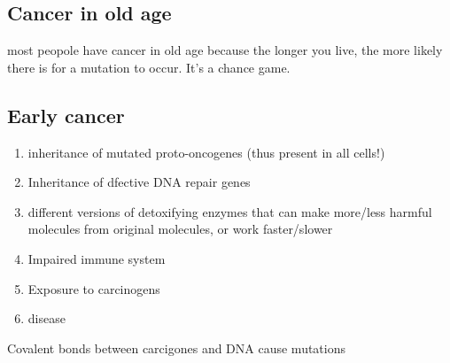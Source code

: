 \documentclass[12pt]{article}
\begin{document}
\subsection{Cancer in old age}
most peopole have cancer in old age because the longer you live,
the more likely there is for a mutation to occur. It's a chance game.

\subsection{Early cancer}
\begin{enumerate}
    \item inheritance of mutated proto-oncogenes (thus present in all cells!)
    \item Inheritance of dfective DNA repair genes
    \item different versions of detoxifying enzymes that can 
    make more/less harmful molecules from original molecules, or work faster/slower
    \item Impaired immune system
    \item Exposure to carcinogens 
    \item disease
\end{enumerate}

\begin{definition}[Carcinogens]
    Covalent bonds between carcigones and DNA cause mutations
\end{definition}
\end{document}
